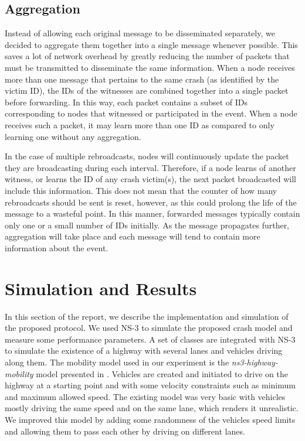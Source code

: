 \documentclass{IEEEtran}
\begin{document}
\subsection{Aggregation}

Instead of allowing each original message to be disseminated separately, we decided to aggregate them together into a single message whenever possible.
This saves a lot of network overhead by greatly reducing the number of packets that must be transmitted to disseminate the same information.
When a node receives more than one message that pertains to the same crash (as identified by the victim ID), the IDs of the witnesses are combined together into a single packet before forwarding.
In this way, each packet contains a subset of IDs corresponding to nodes that witnessed or participated in the event.
When a node receives such a packet, it may learn more than one ID as compared to only learning one without any aggregation.

In the case of multiple rebroadcasts, nodes will continuously update the packet they are broadcasting during each interval.
Therefore, if a node learns of another witness, or learns the ID of any crash victim(s), the next packet broadcasted will include this information.
This does not mean that the counter of how many rebroadcasts should be sent is reset, however, as this could prolong the life of the message to a wasteful point.
In this manner, forwarded messages typically contain only one or a small number of IDs initially.
As the message propagates further, aggregation will take place and each message will tend to contain more information about the event.


\section{Simulation and Results}
In this section of the report, we describe the implementation and simulation of the proposed protocol.
We used NS-3 \cite{ns3} to simulate the proposed crash model and measure some performance parameters. A set of classes are integrated with NS-3 to simulate the existence of a highway with several lanes and vehicles driving along them. The mobility model used in our experiment is the \emph{ns3-highway-mobility} model presented in \cite{highway-mobility}.
Vehicles are created and initiated to drive on the highway at a starting point and with some velocity constraints such as minimum and maximum allowed speed. The existing model was very basic with vehicles mostly driving the same speed and on the same lane, which renders it unrealistic. We improved this model by adding some randomness of the vehicles speed limits and allowing them to pass each other by driving on different lanes.
\end{document}
